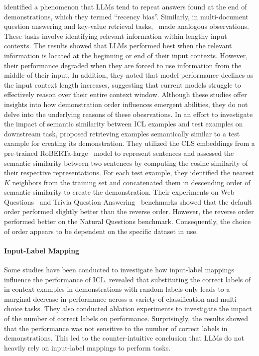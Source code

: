 \citet{Zhao2021CalibrateBU} identified a phenomenon that LLMs tend to repeat answers found at the end of  demonstrations, which they termed ``recency bias''.
Similarly, in multi-document question answering and key-value retrieval tasks,~\citet{Liu2023LostIT} made analogous observations.
These tasks involve identifying relevant information within lengthy input contexts.
The results showed that LLMs performed best when the relevant information is located at the beginning or end of their input contexts.
However, their performance degraded when they are forced to use information from the middle of their input.
In addition, they noted that model performance declines as the input context length increases, suggesting that current models struggle to effectively reason over their entire context window.
Although these studies offer insights into how demonstration order influences emergent abilities, they do not delve into the underlying reasons of these obesrvations.
In an effort to investigate the impact of semantic similarity between ICL examples and test examples on downstream task, \citet{Liu2021WhatMG} proposed retrieving examples semantically similar to a test example for creating its demonstration.
They utilized the CLS embeddings from a pre-trained RoBERTa-large~\citep{Liu2019RoBERTaAR} model to represent sentences and assessed the semantic similarity between two sentences by computing the cosine similarity of their respective representations. 
For each test example, they identified the nearest $K$ neighbors from the training set and concatenated them in descending order of semantic similarity to create the demonstration. 
Their experiments on Web Questions~\cite{Berant2013SemanticPO} and Trivia Question Answering~\cite{Joshi2017TriviaQAAL} benchmarks showed that the default order performed slightly better than the reverse order.
However, the reverse order performed better on the Natural Questions \cite{Kwiatkowski2019NaturalQA} benchmark.
Consequently, the choice of order appears to be dependent on the specific dataset in use.


\paragraph{Input-Label Mapping}
Some studies have been conducted to investigate how input-label mappings influence the performance of ICL.
\citet{Min2022RethinkingTR} revealed that substituting the correct labels of in-context examples in demonstrations with random labels only leads to a marginal decrease in performance across a variety of classification and multi-choice tasks.
They also conducted ablation experiments to investigate the impact of the number of correct labels on performance. Surprisingly, the results showed that the performance was not sensitive to the number of correct labels in demonstrations.
This led to the counter-intuitive conclusion that LLMs do not heavily rely on input-label mappings to perform tasks.

